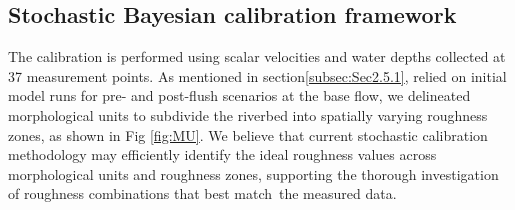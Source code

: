 \documentclass[draft,linenumbers,onecolumn]{agujournal2019} %
\begin{document}
%
%
%

\subsection{Stochastic Bayesian calibration framework}
{\label{sec:Sec2.7}} 

The calibration is performed using scalar velocities and water depths collected at 37 measurement points. As mentioned in section\ref{subsec:Sec2.5.1}, relied on initial model runs for pre- and post-flush scenarios at the base flow, we delineated morphological units to subdivide the riverbed into spatially varying roughness zones, as shown in Fig \ref{fig:MU}. We believe that current stochastic calibration methodology may efficiently identify the ideal roughness values across morphological units and roughness zones, supporting the thorough investigation of roughness combinations that best match the measured data.
\end{document}
